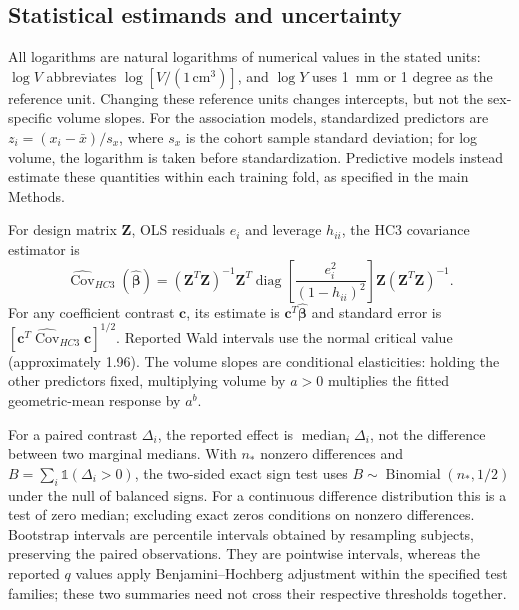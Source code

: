 \subsection{Statistical estimands and uncertainty}
All logarithms are natural logarithms of numerical values in the stated units: $\log V$ abbreviates $\log[V/(1\,\mathrm{cm}^3)]$, and $\log Y$ uses 1~mm or 1 degree as the reference unit. Changing these reference units changes intercepts, but not the sex-specific volume slopes. For the association models, standardized predictors are $z_i=(x_i-\bar x)/s_x$, where $s_x$ is the cohort sample standard deviation; for log volume, the logarithm is taken before standardization. Predictive models instead estimate these quantities within each training fold, as specified in the main Methods.

For design matrix $\mathbf Z$, OLS residuals $e_i$ and leverage $h_{ii}$, the HC3 covariance estimator is
\begin{equation}
\widehat{\operatorname{Cov}}_{HC3}(\widehat{\boldsymbol\beta})=
(\mathbf Z^T\mathbf Z)^{-1}\mathbf Z^T
\operatorname{diag}\!\left[\frac{e_i^2}{(1-h_{ii})^2}\right]
\mathbf Z(\mathbf Z^T\mathbf Z)^{-1}.
\end{equation}
For any coefficient contrast $\mathbf c$, its estimate is $\mathbf c^T\widehat{\boldsymbol\beta}$ and standard error is $[\mathbf c^T\widehat{\operatorname{Cov}}_{HC3}\mathbf c]^{1/2}$. Reported Wald intervals use the normal critical value (approximately 1.96). The volume slopes are conditional elasticities: holding the other predictors fixed, multiplying volume by $a>0$ multiplies the fitted geometric-mean response by $a^b$.

For a paired contrast $\Delta_i$, the reported effect is $\operatorname{median}_i\Delta_i$, not the difference between two marginal medians. With $n_*$ nonzero differences and $B=\sum_i\mathbb 1(\Delta_i>0)$, the two-sided exact sign test uses $B\sim\operatorname{Binomial}(n_*,1/2)$ under the null of balanced signs. For a continuous difference distribution this is a test of zero median; excluding exact zeros conditions on nonzero differences. Bootstrap intervals are percentile intervals obtained by resampling subjects, preserving the paired observations. They are pointwise intervals, whereas the reported $q$ values apply Benjamini--Hochberg adjustment within the specified test families; these two summaries need not cross their respective thresholds together.
